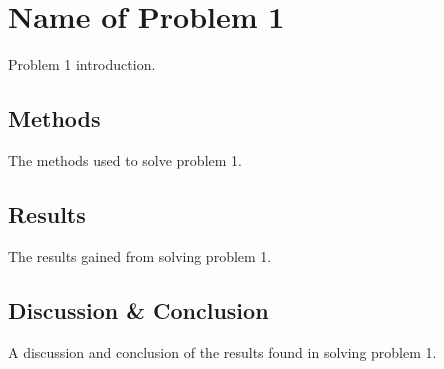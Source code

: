 \chapter{Name of Problem 1}\label{ch:1-tactile-perception}
Problem 1 introduction.

\section{Methods}\label{sec:1-tactile-perception-method}

The methods used to solve problem 1.

\section{Results}\label{sec:1-tactile-perception-results}

The results gained from solving problem 1.

\section{Discussion \& Conclusion}\label{sec:1-tactile-perception-discussion-and-conclusion}

A discussion and conclusion of the results found in solving problem 1.
